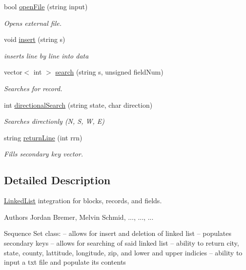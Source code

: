 \begin{DoxyCompactItemize}
bool \hyperlink{classSSClass_a92e012441608ea36f3013fb3cbea9da8}{open\+File} (string input)
\begin{DoxyCompactList}\small\item\em Opens external file. \end{DoxyCompactList}\item 
void \hyperlink{classSSClass_a45c5585c784bf7c4f823f66426664aea}{insert} (string s)
\begin{DoxyCompactList}\small\item\em inserts line by line into data \end{DoxyCompactList}\item 
vector$<$ int $>$ \hyperlink{classSSClass_a9df3598c000a6a5e9ef994d19196e69f}{search} (string s, unsigned field\+Num)
\begin{DoxyCompactList}\small\item\em Searches for record. \end{DoxyCompactList}\item 
int \hyperlink{classSSClass_ad03c99840c2946a2112f5f1942c287f2}{directional\+Search} (string state, char direction)
\begin{DoxyCompactList}\small\item\em Searches directionly (N, S, W, E) \end{DoxyCompactList}\item 
string \hyperlink{classSSClass_ab0a8ea1af895df28359b5733bd920ef3}{return\+Line} (int rrn)
\begin{DoxyCompactList}\small\item\em Fills secondary key vector. \end{DoxyCompactList}\end{DoxyCompactItemize}


\subsection{Detailed Description}
\hyperlink{classLinkedList}{Linked\+List} integration for blocks, records, and fields. 

\begin{DoxyAuthor}{Authors}
Jordan Bremer, Melvin Schmid, ..., ..., ...
\end{DoxyAuthor}
Sequence Set class\+: -- allows for insert and deletion of linked list -- populates secondary keys -- allows for searching of said linked list -- ability to return city, state, county, lattitude, longitude, zip, and lower and upper indicies -- ability to input a txt file and populate it\textquotesingle{}s contents

